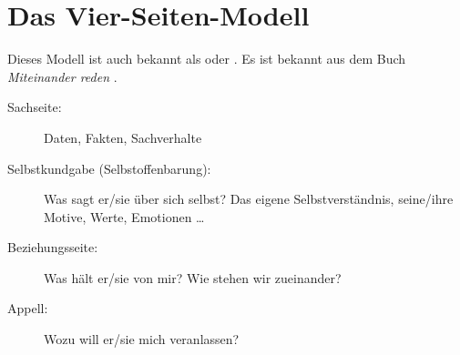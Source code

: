\section{Das Vier-Seiten-Modell}
\label{4-ohren}

Dieses Modell ist auch bekannt als  oder . Es ist bekannt aus dem Buch \emph{Miteinander reden} \cite{miteinander-reden-1}.

\begin{description}
  \item[Sachseite:] Daten, Fakten, Sachverhalte
  \item[Selbstkundgabe (Selbstoffenbarung):] Was sagt er/sie über sich selbst? Das eigene Selbstverständnis, seine/ihre Motive, Werte, Emotionen \ldots
  \item[Beziehungsseite:] Was hält er/sie von mir? Wie stehen wir zueinander?
  \item[Appell:] Wozu will er/sie mich veranlassen?
\end{description}

